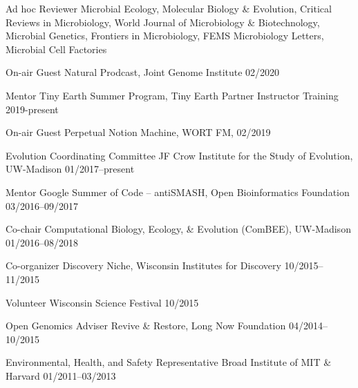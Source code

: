 

\begin{cvhonors}

\cvhonor
{Ad hoc Reviewer}
{Microbial Ecology, Molecular Biology \& Evolution, Critical Reviews in Microbiology, World Journal of Microbiology \& Biotechnology, Microbial Genetics, Frontiers in Microbiology, FEMS Microbiology Letters, Microbial Cell Factories}
{}

\cvhonor
{On-air Guest}
{Natural Prodcast, Joint Genome Institute}
{02/2020}

\cvhonor
{Mentor}
{Tiny Earth Summer Program, Tiny Earth Partner Instructor Training}
{2019-present}

\cvhonor
{On-air Guest}
{Perpetual Notion Machine, WORT FM, \textbf{\textit{}}}
{02/2019}

\cvhonor
{Evolution Coordinating Committee}
{JF Crow Institute for the Study of Evolution, UW-Madison}
{01/2017--present}

\cvhonor
{Mentor}
{Google Summer of Code -- antiSMASH, Open Bioinformatics Foundation}
{03/2016--09/2017}

\cvhonor
{Co-chair}
{Computational Biology, Ecology, \& Evolution (ComBEE), UW-Madison}
{01/2016--08/2018}

\cvhonor
{Co-organizer}
{Discovery Niche, Wisconsin Institutes for Discovery}
{10/2015--11/2015}

\cvhonor
{Volunteer}
{Wisconsin Science Festival}
{10/2015}

\cvhonor
{Open Genomics Adviser}
{Revive \& Restore, Long Now Foundation}
{04/2014--10/2015}

\cvhonor
{Environmental, Health, and Safety Representative}
{Broad Institute of MIT \& Harvard}
{01/2011--03/2013}

\end{cvhonors}